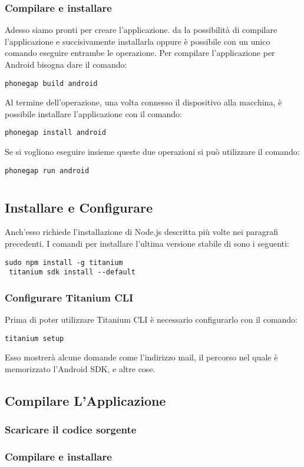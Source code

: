         \subsubsection{Compilare e installare}
            Adesso siamo pronti per creare l'applicazione. \pg{} da la 
            possibilità di compilare l'applicazione e succisivamente 
            installarla oppure è possibile con un unico comando eseguire 
            entrambe le operazione. Per compilare l'applicazione per Android 
            bisogna dare il comando:
            \begin{lstlisting}[language=plane]
 phonegap build android
            \end{lstlisting}
            Al termine dell'operazione, una volta connesso il dispositivo alla 
            macchina, è possibile installare l'applicazione con il comando:
            \begin{lstlisting}[language=plane]
 phonegap install android
            \end{lstlisting}
            
            Se si vogliono eseguire insieme queste due operazioni si può 
            utilizzare il comando:
            \begin{lstlisting}[language=plane]
 phonegap run android
            \end{lstlisting}

\section{\tisdk{}}

    \subsection{Installare e Configurare \tisdk{}}
    Anch'esso richiede l'installazione di Node.js descritta più volte nei
    paragrafi precedenti. I comandi per installare l'ultima versione stabile
    di \tisdk{} sono i seguenti:
    \begin{lstlisting}[language=plane]
 sudo npm install -g titanium
 titanium sdk install --default
    \end{lstlisting}
        \subsubsection{Configurare Titanium CLI}
        Prima di poter utilizzare Titanium CLI è necessario configurarlo con
        il comando:
    \begin{lstlisting}[language=plane]
 titanium setup
    \end{lstlisting}
    Esso mostrerà alcune domande come l'indirizzo mail, il percorso nel quale
    è memorizzato l'Android SDK, e altre cose.
    
    \subsection{Compilare L'Applicazione}
        \subsubsection{Scaricare il codice sorgente}
        \subsubsection{Compilare e installare}
